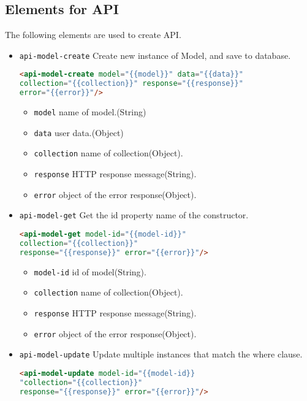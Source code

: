 \subsection{Elements for API}\cite{xpr_api}

The following elements are used to create API.

\begin{itemize}
\item \texttt{api-model-create} Create new instance of Model, and save to database.

\begin{lstlisting}[language=html]
<api-model-create model="{{model}}" data="{{data}}" 
collection="{{collection}}" response="{{response}}" 
error="{{error}}"/>
\end{lstlisting}

\begin{itemize}
\item \texttt{model} name of model.(String)
\item \texttt{data} user data.(Object)
\item \texttt{collection} name of collection(Object).
\item \texttt{response}	HTTP response message(String).
\item \texttt{error} object of the error response(Object).
\end{itemize}

\item \texttt{api-model-get} Get the id property name of the constructor.

\begin{lstlisting}[language=html]
<api-model-get model-id="{{model-id}}" 
collection="{{collection}}" 
response="{{response}}" error="{{error}}"/>
\end{lstlisting}

\begin{itemize}
\item \texttt{model-id} id of model(String).
\item \texttt{collection} name of collection(Object).
\item \texttt{response}	HTTP response message(String).
\item \texttt{error} object of the error response(Object).
\end{itemize}

\item \texttt{api-model-update} Update multiple instances that match the where clause.

\begin{lstlisting}[language=html]
<api-model-update model-id="{{model-id}} 
"collection="{{collection}}" 
response="{{response}}" error="{{error}}"/>
\end{lstlisting}


\end{itemize}
